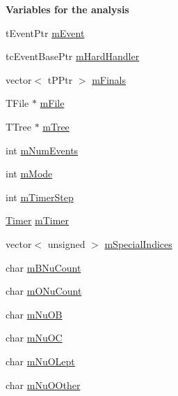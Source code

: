 \begin{Indent}{\bf Variables for the analysis}\par
\begin{DoxyCompactItemize}
\item 
t\+Event\+Ptr \hyperlink{class_herwig_1_1_herwig_tree_af603e5812ed44d611aeaa66e7f6616f6}{m\+Event}
\item 
tc\+Event\+Base\+Ptr \hyperlink{class_herwig_1_1_herwig_tree_a96e103a607ddc543e5ad1c4c097da79f}{m\+Hard\+Handler}
\item 
vector$<$ t\+P\+Ptr $>$ \hyperlink{class_herwig_1_1_herwig_tree_abd8e1116b0df9d4214f77ce86438d4d4}{m\+Finals}
\item 
T\+File $\ast$ \hyperlink{class_herwig_1_1_herwig_tree_a8a5667ccbf263bd6e99590b5155d2c46}{m\+File}
\item 
T\+Tree $\ast$ \hyperlink{class_herwig_1_1_herwig_tree_a03788321f05cfb5f7a119beafbaa29d4}{m\+Tree}
\item 
int \hyperlink{class_herwig_1_1_herwig_tree_a170499fc649b5aced8f83adc5bf8c914}{m\+Num\+Events}
\item 
int \hyperlink{class_herwig_1_1_herwig_tree_a1d47a9344b42319950182483f08444d1}{m\+Mode}
\item 
int \hyperlink{class_herwig_1_1_herwig_tree_a52f0f5dff398cec2740c10dd095f50ec}{m\+Timer\+Step}
\item 
\hyperlink{class_timer}{Timer} \hyperlink{class_herwig_1_1_herwig_tree_a72fcb4b6832d4782d0096c4a16a16683}{m\+Timer}
\item 
vector$<$ unsigned $>$ \hyperlink{class_herwig_1_1_herwig_tree_aa1b6f46c32e4d9ccf20dce2515cfd1e7}{m\+Special\+Indices}
\item 
char \hyperlink{class_herwig_1_1_herwig_tree_a3a3a0ddaf489eb0e4a049eaf7cd084b2}{m\+B\+Nu\+Count}
\item 
char \hyperlink{class_herwig_1_1_herwig_tree_a28df6b8b7b033370f9817f3e055fbb44}{m\+O\+Nu\+Count}
\item 
char \hyperlink{class_herwig_1_1_herwig_tree_a25e21e2c469c2a038390355a95423b83}{m\+Nu\+OB}
\item 
char \hyperlink{class_herwig_1_1_herwig_tree_a65ef841ae6a9c77c5a351349a26d3005}{m\+Nu\+OC}
\item 
char \hyperlink{class_herwig_1_1_herwig_tree_a68bc0ced9a248641fa1448a2d4fcc5b6}{m\+Nu\+O\+Lept}
\item 
char \hyperlink{class_herwig_1_1_herwig_tree_a602e6fb6d9510a1b4bd75d39b3995aa2}{m\+Nu\+O\+Other}
\item 

\end{DoxyCompactItemize}
\end{Indent}
